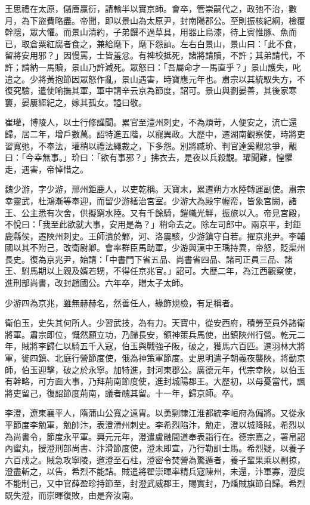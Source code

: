 \begin{pinyinscope}
 王思禮在太原，儲廥贏衍，請輸半以實京師。會卒，管崇嗣代之，政弛不治，數月，為下盜費略盡。帝聞，即以景山為太原尹，封南陽郡公。至則振核紀綱，檢覆幹隱，眾大懼。而景山清約，子弟饌不過草具，用器止烏漆，待上賓惟豚、魚而已，取倉粟紅腐者食之，兼給麾下，麾下怨訕。左右白景山，景山曰：「此不食，留將安用邪？」因慢罵，士皆羞忿。有裨校抵死，諸將請贖，不許；其弟請代，不許；請納一馬贖，景山乃許減死。眾怒曰：「吾屬命才一馬直乎？」景山護失，叱遣之。少將黃抱節因眾怒作亂，景山遇害，時寶應元年也。肅宗以其統馭失方，不復究驗，遣使喻撫其軍，軍中請辛云京為節度，詔可。景山與劉晏善，其後家寒窶，晏屢經紀之，嫁其孤女。謚曰敬。



 崔瓘，博陵人，以士行修謹聞。累官至澧州刺史，不為煩苛，人便安之，流亡還歸，居二年，增戶數萬。詔特進五階，以寵異政。大歷中，遷湖南觀察使，時將吏習寬弛，不奉法，瓘稍以禮法繩裁之，下多怨。別將臧玠、判官達奚覯忿爭，覯曰：「今幸無事。」玠曰：「欲有事邪？」拂衣去，是夜以兵殺覯。瓘聞難，惶懼走，遇害，帝悼惜之。



 魏少游，字少游，邢州鉅鹿人，以吏乾稱。天寶末，累遷朔方水陸轉運副使。肅宗幸靈武，杜鴻漸等奉迎，而留少游繕治宮室。少游大為殿宇幄帟，皆象宮闕，諸王、公主悉有次舍，供擬窮水陸。又有千餘騎，鎧幟光鮮，振旅以入。帝見宮殿，不悅曰：「我至此欲就大事，安用是為？」稍命去之。除左司郎中。兩京平，封鉅鹿縣侯，遷陜州刺史。王師潰於鄴，河、洛震駭，少游鎮守自若。擢京兆尹。李輔國以其不附己，改衛尉卿。會率群臣馬助軍，少游與漢中王瑀持異，帝怒，貶渠州長史。復為京兆尹，始請：「中書門下省五品、尚書省四品、諸司正員三品、諸王、駙馬期以上親及婿若甥，不得任京兆官。」詔可。大歷二年，為江西觀察使，進刑部尚書，改封趙國公。六年卒，贈太子太師。



 少游四為京兆，雖無赫赫名，然善任人，緣飾規檢，有足稱者。



 衛伯玉，史失其何所人。少習武技，為有力。天寶中，從安西府，積勞至員外諸衛將軍。肅宗即位，慨然願立功，乃歸長安，領神策兵馬使，出鎮陜州行營。乾元二年，賊將李歸仁以騎五千入寇，伯玉與戰強子阪，破之，獲馬六百匹。遷羽林大將軍，徙四鎮、北庭行營節度使，俄為神策軍節度。史思明遣子朝義夜襲陜，將動京師，伯玉迎擊，破之於永寧。加特進，封河東郡公。廣德元年，代宗幸陜，以伯玉有幹略，可方面大事，乃拜荊南節度使，進封城陽郡王。大歷初，以母憂當代，諷將吏留己，復詔節度荊南，議者醜其留。十一年，歸京師。卒。



 李澄，遼東襄平人，隋蒲山公寬之遠胄。以勇剽隸江淮都統李峘府為偏將。又從永平節度李勉軍，勉帥汴，表澄滑州刺史。李希烈陷汴，勉走，澄以城降賊，希烈以為尚書令，節度永平軍。興元元年，澄遣盧融間道奉表詣行在。德宗嘉之，署帛詔內蜜丸，授澄刑部尚書、汴滑節度使，澄未即宣，乃行勒訓士馬。希烈疑，以養子六百戍之。賊急攻寧陵，邀澄至石柱，澄密令焚營為驚遁者，養子輩果乘以剽掠，澄盡斬之，以告，希烈不能詰。賊遣將翟崇暉率精兵寇陳州，未還，汴軍寡，澄度不能制己，又中官薛盈珍持節至，封澄武威郡王，賜實封，乃燔賊旗節自歸。希烈既失澄，而崇暉復敗，由是奔汝南。




\end{pinyinscope}
